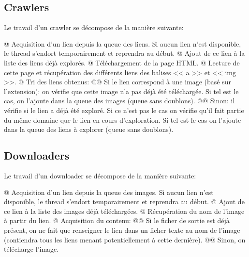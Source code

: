 \documentclass[hideweeklyreports,noposter]{polytech/polytech}
\begin{document}
			\subsection{Crawlers}
				Le travail d'un crawler se décompose de la manière suivante:
				\begin{easylist}
					@ Acquisition d'un lien depuis la queue des liens.
					Si aucun lien n'est disponible, le thread s'endort temporairement et reprendra au début.
					@ Ajout de ce lien à la liste des liens déjà explorés.
					@ Téléchargement de la page HTML.
					@ Lecture de cette page et récupération des différents liens des balises << a >> et << img >>.
					@ Tri des liens obtenus:
					@@ Si le lien correspond à une image (basé sur l'extension): on vérifie que cette image n'a pas déjà été téléchargée.
					Si tel est le cas, on l'ajoute dans la queue des images (queue sans doublons).
					@@ Sinon: il vérifie si le lien a déjà été exploré.
					Si ce n'est pas le cas on vérifie qu'il fait partie du même domaine que le lien en cours d'exploration.
					Si tel est le cas on l'ajoute dans la queue des liens à explorer (queue sans doublons).
				\end{easylist}
			
			\subsection{Downloaders}
				Le travail d'un downloader se décompose de la manière suivante:
				\begin{easylist}
					@ Acquisition d'un lien depuis la queue des images.
					Si aucun lien n'est disponible, le thread s'endort temporairement et reprendra au début.
					@ Ajout de ce lien à la liste des images déjà téléchargées.
					@ Récupération du nom de l'image à partir du lien.
					@ Acquisition du contenu:
					@@ Si le ficher de sortie est déjà présent, on ne fait que renseigner le lien dans un ficher texte au nom de l'image (contiendra tous les liens menant potentiellement à cette dernière).
					@@ Sinon, on télécharge l'image.
				\end{easylist}
				
\end{document}
